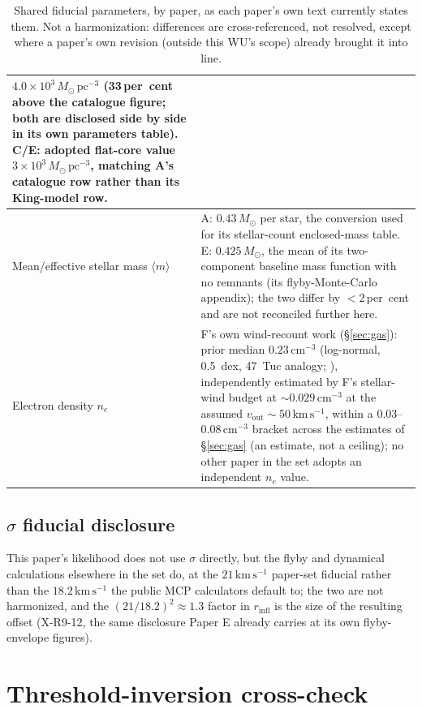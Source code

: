 \documentclass[11pt]{article}
\newcommand{\msun}{\ensuremath{M_\odot}}
\begin{document}
\begin{table}[htbp]
\begin{tabular}{p{2.1cm}p{9.6cm}}
$4.0\times10^{3}\,\msun\,\mathrm{pc}^{-3}$ (33\,per~cent above the catalogue
figure; both are disclosed side by side in its own parameters table). C/E:
adopted flat-core value $3\times10^{3}\,\msun\,\mathrm{pc}^{-3}$, matching A's
catalogue row rather than its King-model row. \\
\midrule
Mean/effective stellar mass $\langle m\rangle$ &
A: $0.43\,\msun$ per star, the conversion used for its stellar-count
enclosed-mass table. E: $0.425\,\msun$, the
mean of its two-component baseline mass function with no remnants
(its flyby-Monte-Carlo appendix); the two differ by $<2$\,per~cent and are not reconciled
further here. \\
\midrule
Electron density $n_e$ &
F's own wind-recount work (\S\ref{sec:gas}): prior median
$0.23\,\mathrm{cm^{-3}}$ (log-normal, 0.5~dex, 47~Tuc analogy;
\citealt{Freire2001,Abbate2018}), independently estimated by F's
stellar-wind budget at $\sim 0.029\,\mathrm{cm^{-3}}$ at the assumed
$v_{\mathrm{out}} \sim 50\,\mathrm{km\,s^{-1}}$, within a 0.03--0.08\,$\mathrm{cm^{-3}}$
bracket across the estimates of \S\ref{sec:gas} (an estimate, not a ceiling); no other paper in the
set adopts an independent $n_e$ value. \\
\bottomrule
\end{tabular}
\caption{Shared fiducial parameters, by paper, as each paper's own text
currently states them. Not a harmonization: differences are cross-referenced,
not resolved, except where a paper's own revision (outside this WU's scope)
already brought it into line.}
\label{tab:ssot}
\end{table}

\subsection{$\sigma$ fiducial disclosure}
\label{sec:sigma-fiducial-note}
This paper's likelihood does not use
$\sigma$ directly, but the flyby and dynamical calculations elsewhere in the
set do, at the $21\,\mathrm{km\,s^{-1}}$ paper-set fiducial rather than the
$18.2\,\mathrm{km\,s^{-1}}$ the public MCP calculators default to; the two are
not harmonized, and the $(21/18.2)^{2} \approx 1.3$ factor in $r_{\mathrm{infl}}$
is the size of the resulting offset (X-R9-12, the same disclosure Paper E
already carries at its own flyby-envelope figures).

\section{Threshold-inversion cross-check}
\label{app:mincheck}
\end{document}
